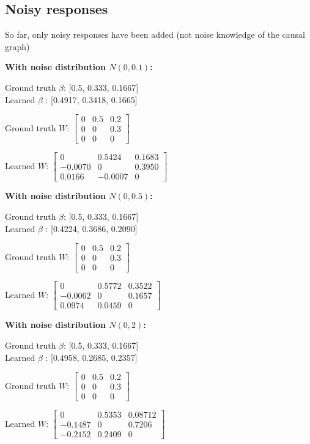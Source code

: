 \subsection{Noisy responses}

So far, only noisy responses have been added (not noise knowledge of the causal graph)

\textbf{With noise distribution $N(0, 0.1)$:}

Ground truth $\beta$: [0.5, 0.333, 0.1667] \\
Learned $\beta$ : [0.4917, 0.3418, 0.1665]

Ground truth $W$: $\begin{bmatrix}
	0 & 0.5 & 0.2 \\
	0 & 0 & 0.3 \\
	0 & 0 & 0
\end{bmatrix}$

Learned $W$: $\begin{bmatrix}
	0 & 0.5424 & 0.1683 \\
	-0.0070 & 0 & 0.3950 \\
	0.0166 & -0.0007 & 0
\end{bmatrix}$


\textbf{With noise distribution $N(0, 0.5)$:}

Ground truth $\beta$: [0.5, 0.333, 0.1667] \\
Learned $\beta$ : [0.4224, 0.3686, 0.2090]

Ground truth $W$: $\begin{bmatrix}
	0 & 0.5 & 0.2 \\
	0 & 0 & 0.3 \\
	0 & 0 & 0
\end{bmatrix}$

Learned $W$: $\begin{bmatrix}
	0 & 0.5772 & 0.3522 \\
	-0.0062 & 0 & 0.1657 \\
	0.0974 & 0.0459 & 0
\end{bmatrix}$

\textbf{With noise distribution $N(0, 2)$:}

Ground truth $\beta$: [0.5, 0.333, 0.1667] \\
Learned $\beta$ : [0.4958, 0.2685, 0.2357]

Ground truth $W$: $\begin{bmatrix}
	0 & 0.5 & 0.2 \\
	0 & 0 & 0.3 \\
	0 & 0 & 0
\end{bmatrix}$

Learned $W$: $\begin{bmatrix}
	0 & 0.5353 & 0.08712 \\
	-0.1487 & 0 & 0.7206 \\
	-0.2152 & 0.2409 & 0
\end{bmatrix}$